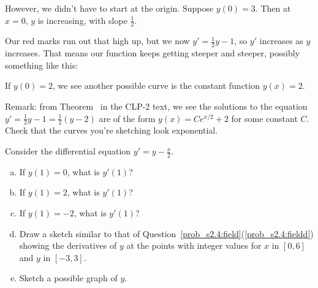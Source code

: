 \begin{solution}
\begin{enumerate}[(a)]
However, we didn't have to start at the origin. Suppose $y(0)=3$. Then at $x=0$, $y$ is increasing, with slope $\frac{1}{2}$.

\begin{center}
\end{center}
Our red marks run out that high up, but we now $y'=\frac{1}{2}y-1$, so $y'$ increases as $y$ increases. That means our function keeps getting steeper and steeper, possibly something like this:
\begin{center}
\end{center}
If $y(0)=2$, we see another possible curve is the constant function $y(x)=2$.
\end{enumerate}
Remark: from Theorem~ in the CLP-2 text, we see the solutions to the equation $y'=\frac{1}{2}y-1 = \frac{1}{2}(y-2)$ are of the form $y(x)=Ce^{x/2}+2$ for some constant $C$. Check that the curves you're sketching look exponential.
\end{solution}
\begin{question}
Consider the differential equation $y'=y-\frac{x}{2}$.
\begin{enumerate}[(a)]
\item If $y(1)=0$, what is $y'(1)$?
\item If $y(1)=2$, what is $y'(1)$?
\item If $y(1)=-2$, what is $y'(1)$?
\item Draw a sketch similar to that of Question~\ref{prob_s2.4:field}(\ref{prob_s2.4:fieldd})
showing the derivatives of $y$ at the points with integer values for $x$ in $[0,6]$ and $y$ in $[-3,3]$.
\item Sketch a possible graph of $y$.
\end{enumerate}
\end{question}
